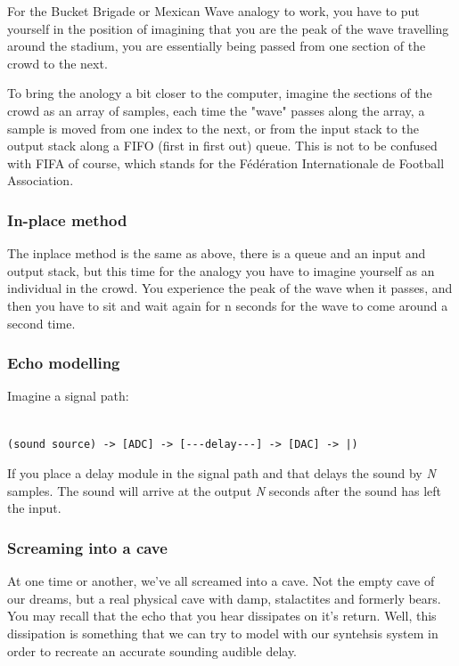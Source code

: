 \documentclass[11pt]{article}
\begin{document}
For the Bucket Brigade or Mexican Wave analogy to work, you have to
put yourself in the position of imagining that you are the peak of the
wave travelling around the stadium, you are essentially being passed
from one section of the crowd to the next.

To bring the anology a bit closer to the computer, imagine the
sections of the crowd as an array of samples, each time the "wave"
passes along the array, a sample is moved from one index to the next,
or from the input stack to the output stack along a FIFO (first in
first out) queue. This is not to be confused with FIFA of course,
which stands for the Fédération Internationale de Football Association.

\subsubsection{In-place method}
\label{sec:org96ccd20}
The inplace method is the same as above, there is a queue and an input
and output stack, but this time for the analogy you have to imagine
yourself as an individual in the crowd. You experience the peak of the
wave when it passes, and then you have to sit and wait again for n
seconds for the wave to come around a second time.

\subsubsection{Echo modelling}
\label{sec:org821942d}
Imagine a signal path: 
\begin{verbatim}

(sound source) -> [ADC] -> [---delay---] -> [DAC] -> |) 

\end{verbatim}

If you place a delay module in the signal path and that delays the 
sound by \emph{N} samples. The sound will arrive at the output \emph{N} seconds
after the sound has left the input.

\subsubsection{Screaming into a cave}
\label{sec:org0f4f176}
At one time or another, we've all screamed into a cave. Not the empty
cave of our dreams, but a real physical cave with damp, stalactites
and formerly bears. You may recall that the echo that you hear
dissipates on it's return. Well, this dissipation is something that we
can try to model with our syntehsis system in order to recreate an
accurate sounding audible delay. 
\end{document}
